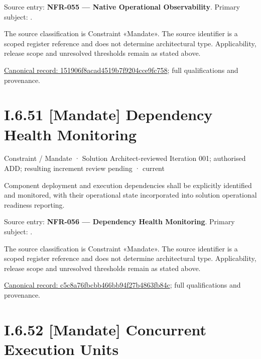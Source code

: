 Source entry: \textbf{NFR-055 — Native Operational Observability}. Primary subject: \texttt{}.



The source classification is Constraint «Mandate». The source identifier is a scoped register reference and does not determine architectural type. Applicability, release scope and unresolved thresholds remain as stated above.


{\footnotesize \href{../../../../../../../continuum/motivation/constraint/mandate/151906f8acad4519b7f9204cce9fc758.md}{Canonical record: 151906f8acad4519b7f9204cce9fc758}; full qualifications and provenance.}\par
\section*{I.6.51 [Mandate] Dependency Health Monitoring}
\label{navigation:I.6.51}

\label{element:c5c8a76fbcbb466bb94f27b4863fb84c}
{\small Constraint / Mandate · Solution Architect-reviewed Iteration 001; authorised ADD; resulting increment review pending · current}\par

Component deployment and execution dependencies shall be explicitly identified and monitored, with their operational state incorporated into solution operational readiness reporting.



Source entry: \textbf{NFR-056 — Dependency Health Monitoring}. Primary subject: \texttt{}.



The source classification is Constraint «Mandate». The source identifier is a scoped register reference and does not determine architectural type. Applicability, release scope and unresolved thresholds remain as stated above.


{\footnotesize \href{../../../../../../../continuum/motivation/constraint/mandate/c5c8a76fbcbb466bb94f27b4863fb84c.md}{Canonical record: c5c8a76fbcbb466bb94f27b4863fb84c}; full qualifications and provenance.}\par
\section*{I.6.52 [Mandate] Concurrent Execution Units}
\label{navigation:I.6.52}

